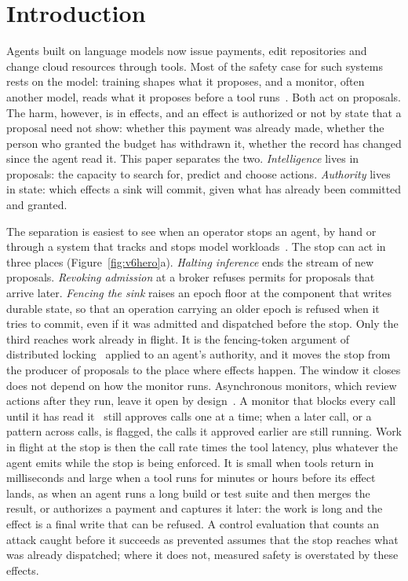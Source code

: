 \section{Introduction}\label{sec:intro}

Agents built on language models now issue payments, edit repositories and change cloud resources through tools. Most
of the safety case for such systems rests on the model: training shapes what it proposes, and a monitor, often another
model, reads what it proposes before a tool runs~\cite{control,metraudit}. Both act on proposals. The harm, however, is
in effects, and an effect is authorized or not by state that a proposal need not show: whether this payment was already
made, whether the person who granted the budget has withdrawn it, whether the record has changed since the agent read
it. This paper separates the two. \emph{Intelligence} lives in proposals: the capacity to search for, predict and
choose actions. \emph{Authority} lives in state: which effects a sink will commit, given what has already been
committed and granted.

The separation is easiest to see when an operator stops an agent, by hand or through a system that tracks and stops
model workloads~\cite{controlroom}. The stop can act in three places (Figure~\ref{fig:v6hero}a). \emph{Halting inference} ends the
stream of new proposals. \emph{Revoking admission} at a broker refuses permits for proposals that arrive later.
\emph{Fencing the sink} raises an epoch floor at the component that writes durable state, so that an operation carrying
an older epoch is refused when it tries to commit, even if it was admitted and dispatched before the stop. Only the
third reaches work already in flight. It is the fencing-token argument of distributed locking~\cite{kleppmann2016}
applied to an agent's authority, and it moves the stop from the producer of proposals to the place where effects
happen. The window it closes does not depend on how the monitor runs. Asynchronous monitors, which review actions after
they run, leave it open by design~\cite{stickland2025async}. A monitor that blocks every call until it has
read it~\cite{lucassen2026blocking} still approves calls one at a time; when a later call, or a pattern across calls, is flagged, the calls it
approved earlier are still running. Work in flight at the stop is then the call rate times the tool latency, plus
whatever the agent emits while the stop is being enforced. It is small when tools return in milliseconds and large when
a tool runs for minutes or hours before its effect lands, as when an agent runs a long build or test suite and then
merges the result, or authorizes a payment and captures it later: the work is long and the effect is a final write that
can be refused. A control evaluation that counts an attack caught before it succeeds as prevented assumes that the stop
reaches what was already dispatched; where it does not, measured safety is overstated by these effects.


